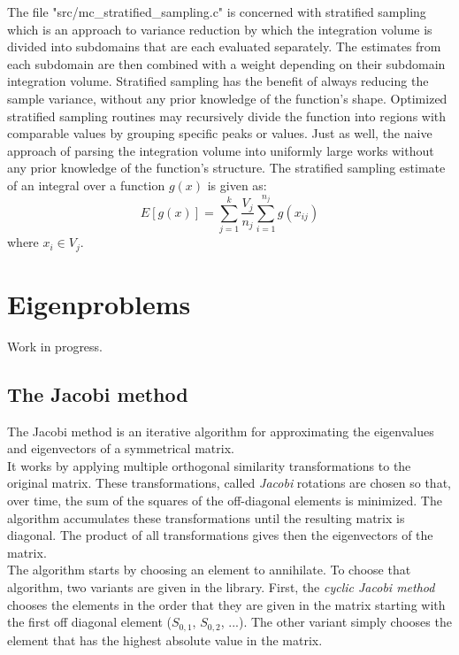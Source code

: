 \documentclass{book}
\begin{document}
The file "src/mc\_stratified\_sampling.c" is concerned with stratified sampling which is an approach to variance reduction
by which the integration volume is divided into subdomains that are each evaluated separately. The estimates from each
subdomain are then combined with a weight depending on their subdomain integration volume. Stratified sampling has the
benefit of always reducing the sample variance, without any prior knowledge of the function’s shape. Optimized stratified
sampling routines may recursively divide the function into regions with comparable values by grouping specific peaks or values.
Just as well, the naive approach of parsing the integration volume into uniformly large works without any prior knowledge of the function’s structure.
The stratified sampling estimate of an integral over a function $g(x)$ is given as:
$$
 E[g(x)] = \sum_{j=1}^k \frac{V_j}{n_j} \sum_{i=1}^{n_j} g(x_{ij})
$$
where $x_i \in V_j$.



\section{Eigenproblems}

Work in progress.
\subsection{The Jacobi method}

The Jacobi method is an iterative algorithm for approximating the eigenvalues and eigenvectors of a symmetrical matrix. \\

It works by applying multiple orthogonal similarity transformations to the original matrix. These transformations, called \textit{Jacobi} rotations are chosen so that, over time, the sum of the squares of the off-diagonal elements is minimized. The algorithm accumulates these transformations until the resulting matrix is diagonal. The product of all transformations gives then the eigenvectors of the matrix. \\

The algorithm starts by choosing an element to annihilate. To choose that algorithm, two variants are given in the library. First, the \textit{cyclic Jacobi method} chooses the elements in the order that they are given in the matrix starting with the first off diagonal element ($S_{0,1}$, $S_{0,2}$, ...). The other variant simply chooses the element that has the highest absolute value in the matrix. \\
\end{document}
